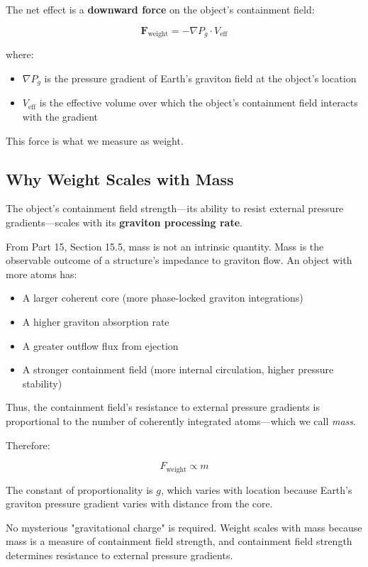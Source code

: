 \documentclass[12pt, a4paper]{article}
\begin{document}
The net effect is a \textbf{downward force} on the object's containment field:

\[
\mathbf{F}_{\text{weight}} = - \nabla P_g \cdot V_{\text{eff}}
\]

where:
\begin{itemize}
    \item \( \nabla P_g \) is the pressure gradient of Earth's graviton field at the object's location
    \item \( V_{\text{eff}} \) is the effective volume over which the object's containment field interacts with the gradient
\end{itemize}

This force is what we measure as weight.

\subsection{Why Weight Scales with Mass}
\label{subsec:weight_scaling}

The object's containment field strength—its ability to resist external pressure gradients—scales with its \textbf{graviton processing rate}.

From Part 15, Section 15.5, mass is not an intrinsic quantity. Mass is the observable outcome of a structure's impedance to graviton flow. An object with more atoms has:

\begin{itemize}
    \item A larger coherent core (more phase-locked graviton integrations)
    \item A higher graviton absorption rate
    \item A greater outflow flux from ejection
    \item A stronger containment field (more internal circulation, higher pressure stability)
\end{itemize}

Thus, the containment field's resistance to external pressure gradients is proportional to the number of coherently integrated atoms—which we call \textit{mass}.

Therefore:

\[
F_{\text{weight}} \propto m
\]

The constant of proportionality is \( g \), which varies with location because Earth's graviton pressure gradient varies with distance from the core.

No mysterious "gravitational charge" is required. Weight scales with mass because mass is a measure of containment field strength, and containment field strength determines resistance to external pressure gradients.
\end{document}
